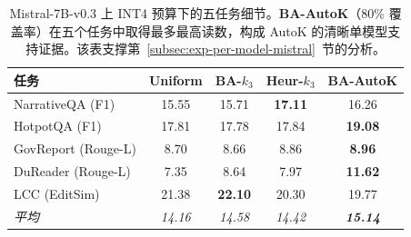 \begin{table}[!htbp]
  \centering
  \small
  \setlength{\tabcolsep}{6pt}
  \begin{tabular}{l cccc}
    \toprule
    \textbf{任务} & Uniform & BA-$k_3$ & Heur-$k_3$ & \textbf{BA-AutoK} \\
    \midrule
    NarrativeQA (F1) & 15.55 & 15.71 & \textbf{17.11} & 16.26 \\
    HotpotQA (F1) & 17.81 & 17.78 & 17.84 & \textbf{19.08} \\
    GovReport (Rouge-L) & 8.70 & 8.66 & 8.86 & \textbf{8.96} \\
    DuReader (Rouge-L) & 7.35 & 8.64 & 7.97 & \textbf{11.62} \\
    LCC (EditSim) & 21.38 & \textbf{22.10} & 20.30 & 19.77 \\
    \midrule
    \textit{平均} & \textit{14.16} & \textit{14.58} & \textit{14.42} & \textit{\textbf{15.14}} \\
    \bottomrule
  \end{tabular}
  \caption{Mistral-7B-v0.3 上 INT4 预算下的五任务细节。\textbf{BA-AutoK}（80\% 覆盖率）在五个任务中取得最多最高读数，构成 AutoK 的清晰单模型支持证据。该表支撑第~\ref{subsec:exp-per-model-mistral}~节的分析。}
  \label{tab:t4-mistral-autok}
  \par\smallskip{}
\end{table}
